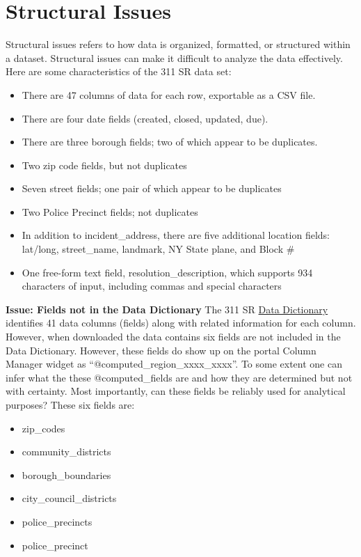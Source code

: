 \documentclass[12pt, titlepage]{article}
\begin{document}
\section{Structural Issues}
\label{sec:structural}
Structural issues refers to how data is organized, formatted, 
or structured within a dataset. Structural issues can make 
it difficult to analyze the data effectively. Here are some 
characteristics of the 311 SR data set:

\begin{itemize}
	\item There are 47 columns of data for each row, exportable as a CSV file.
	\item There are four date fields (created, closed, updated, due).
	\item There are three borough fields; two of which appear to be duplicates.
	\item Two zip code fields, but not duplicates
	\item Seven street fields; one pair of which appear to be duplicates
	\item Two Police Precinct fields; not duplicates
	\item In addition to incident\_address, there are five additional location fields: 
	lat/long, street\_name, landmark, NY State plane, and Block \#
	\item One free-form text field, resolution\_description, which 
	supports 934 characters of input, including commas and special characters
\end{itemize}

\textbf{Issue: Fields not in the Data Dictionary} The 311 SR 
\href{https://data.cityofnewyork.us/api/views/erm2-nwe9/files/b372b884-f86a-453b-ba16-1fe06ce9d212?download=true&filename=311_ServiceRequest_2010-Present_DataDictionary_Updated_2023.xlsx}{Data Dictionary}
 identifies 41 data columns (fields) along with related information 
 for each column. However, when downloaded the data contains 
 six fields are not included in the Data Dictionary. However, these
 fields do show up on the portal Column Manager widget
 as ``@computed\_region\_xxxx\_xxxx''. To some extent one can infer 
 what the these @computed\_fields are and how they are determined but
 not with certainty. Most importantly, can these fields be reliably 
 used for analytical purposes?  These six fields are:

\begin{itemize}
	\item zip\_codes
	\item community\_districts
	\item borough\_boundaries
	\item city\_council\_districts
	\item police\_precincts
	\item police\_precinct 
\end{itemize}	
\end{document}
